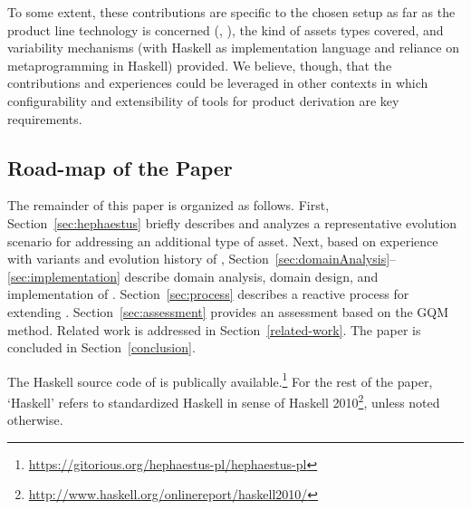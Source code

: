 To some extent, these contributions are specific to the chosen setup as far as the product line technology is concerned (\hp, \hpl), the kind of assets types covered, and variability mechanisms (with Haskell as implementation language and reliance on metaprogramming in Haskell) provided. We believe, though, that the contributions and experiences could be leveraged in other contexts in which configurability and extensibility of tools for product derivation are key requirements.


\subsection*{Road-map of the Paper}

The remainder of this paper is organized as follows. First, Section~\ref{sec:hephaestus} briefly describes \hp{} and analyzes a representative evolution scenario for addressing an additional type of asset. Next, based on experience with variants and evolution history of \hp, Section~\ref{sec:domainAnalysis}--\ref{sec:implementation} describe 
domain analysis, domain design, and implementation of \hpl. Section~\ref{sec:process} describes a reactive process for extending \hpl. Section~\ref{sec:assessment} provides an assessment \hpl{} based on the GQM method. Related work is addressed in Section~\ref{related-work}. The paper is concluded in Section~\ref{conclusion}. 

The Haskell source code of \hpl{} is publically available.\footnote{\url{https://gitorious.org/hephaestus-pl/hephaestus-pl}} For the rest of the paper, `Haskell' refers to standardized Haskell in sense of Haskell 2010\footnote{\url{http://www.haskell.org/onlinereport/haskell2010/}}, unless noted otherwise.

